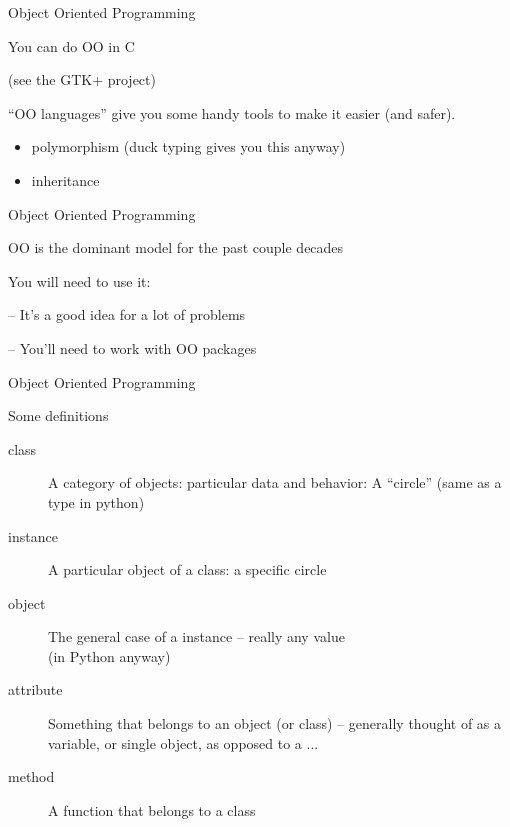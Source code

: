 \documentclass{beamer}
\begin{document}
\begin{frame}[fragile]{Object Oriented Programming}

\vfill
{\LARGE You can do OO in C}

(see the GTK+ project)

\vfill
{\Large 
``OO languages'' give you some handy tools to make it easier (and safer).
}

\vfill
{\Large
\begin{itemize}
  \item polymorphism (duck typing gives you this anyway)
  \item inheritance
\end{itemize}
}
\end{frame} 

\begin{frame}[fragile]{Object Oriented Programming}

\vfill
{\Large OO is the dominant model for the past couple decades

\vfill
You will need to use it:

\vfill
-- It's a good idea for a lot of problems

\vfill
-- You'll need to work with OO packages
}
\end{frame} 

\begin{frame}[fragile]{Object Oriented Programming}

\vfill
{\LARGE Some definitions}

\begin{description}
  \item[class] A category of objects: particular data and behavior: A ``circle'' (same as a type in python)
  \item[instance] A particular object of a class: a specific circle
  \item[object] The general case of a instance -- really any value\\ (in Python anyway)
  \item[attribute] Something that belongs to an object (or class)
    -- generally thought of as a variable, or single object, as opposed to a ...
  \item[method] A function that belongs to a class
\end{description}

\end{frame} 
\end{document}
